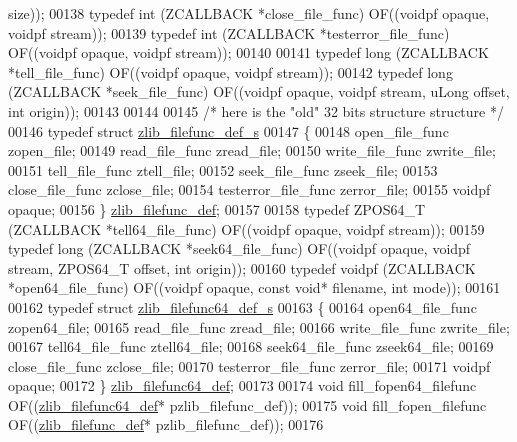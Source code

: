 \begin{DoxyCode}
      size));
00138 \textcolor{keyword}{typedef} int      (ZCALLBACK *close\_file\_func)     OF((voidpf opaque, voidpf stream));
00139 \textcolor{keyword}{typedef} int      (ZCALLBACK *testerror\_file\_func) OF((voidpf opaque, voidpf stream));
00140 
00141 \textcolor{keyword}{typedef} long     (ZCALLBACK *tell\_file\_func)      OF((voidpf opaque, voidpf stream));
00142 \textcolor{keyword}{typedef} long     (ZCALLBACK *seek\_file\_func)      OF((voidpf opaque, voidpf stream, uLong offset, \textcolor{keywordtype}{int} 
      origin));
00143 
00144 
00145 \textcolor{comment}{/* here is the "old" 32 bits structure structure */}
00146 \textcolor{keyword}{typedef} \textcolor{keyword}{struct }\hyperlink{structzlib__filefunc__def__s}{zlib\_filefunc\_def\_s}
00147 \{
00148     open\_file\_func      zopen\_file;
00149     read\_file\_func      zread\_file;
00150     write\_file\_func     zwrite\_file;
00151     tell\_file\_func      ztell\_file;
00152     seek\_file\_func      zseek\_file;
00153     close\_file\_func     zclose\_file;
00154     testerror\_file\_func zerror\_file;
00155     voidpf              opaque;
00156 \} \hyperlink{structzlib__filefunc__def__s}{zlib\_filefunc\_def};
00157 
00158 \textcolor{keyword}{typedef} ZPOS64\_T (ZCALLBACK *tell64\_file\_func)    OF((voidpf opaque, voidpf stream));
00159 \textcolor{keyword}{typedef} long     (ZCALLBACK *seek64\_file\_func)    OF((voidpf opaque, voidpf stream, ZPOS64\_T offset, \textcolor{keywordtype}{int} 
      origin));
00160 \textcolor{keyword}{typedef} voidpf   (ZCALLBACK *open64\_file\_func)    OF((voidpf opaque, \textcolor{keyword}{const} \textcolor{keywordtype}{void}* filename, \textcolor{keywordtype}{int} mode));
00161 
00162 \textcolor{keyword}{typedef} \textcolor{keyword}{struct }\hyperlink{structzlib__filefunc64__def__s}{zlib\_filefunc64\_def\_s}
00163 \{
00164     open64\_file\_func    zopen64\_file;
00165     read\_file\_func      zread\_file;
00166     write\_file\_func     zwrite\_file;
00167     tell64\_file\_func    ztell64\_file;
00168     seek64\_file\_func    zseek64\_file;
00169     close\_file\_func     zclose\_file;
00170     testerror\_file\_func zerror\_file;
00171     voidpf              opaque;
00172 \} \hyperlink{structzlib__filefunc64__def__s}{zlib\_filefunc64\_def};
00173 
00174 \textcolor{keywordtype}{void} fill\_fopen64\_filefunc OF((\hyperlink{structzlib__filefunc64__def__s}{zlib\_filefunc64\_def}* pzlib\_filefunc\_def));
00175 \textcolor{keywordtype}{void} fill\_fopen\_filefunc OF((\hyperlink{structzlib__filefunc__def__s}{zlib\_filefunc\_def}* pzlib\_filefunc\_def));
00176 

\end{DoxyCode}
